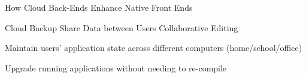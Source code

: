 \begin{frame}{}
{\begin{center}
\begin{minipage}{.9\textwidth}
{\begin{minipage}{\textwidth}
\begin{lightquadblock}{How Cloud Back-Ends Enhance Native Front Ends}
{\Large\begin{itemize}
\sqitem {\lsep}  Cloud Backup {\MyOct} Share Data between Users {\MyOct} Collaborative Editing \vspace{1em}
\sqitem {\lsep}  \parbox[t]{14cm}{Maintain users' application state across different 
computers (home/school/office)\vspace{1em}}
\sqitem {\lsep}  Upgrade running applications without needing to re-compile
\vspace{1em}
\end{itemize} }
\end{lightquadblock}
\end{minipage}}

\end{minipage}
\end{center}
}

\end{frame}
